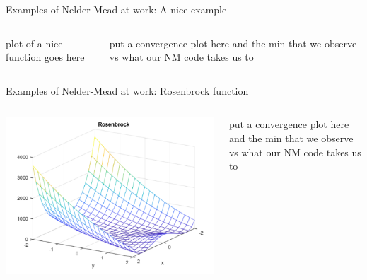 \documentclass{beamer}
\begin{document}
\begin{frame}{Examples of Nelder-Mead at work: A nice example}
\begin{columns}
\begin{column}{0.4\linewidth}
	plot of a nice function goes here	
\end{column}
\begin{column}{0.58\linewidth}
	put a convergence plot here and the min that we observe vs what our NM code takes us to
\end{column}
\end{columns}
\end{frame}

\begin{frame}{Examples of Nelder-Mead at work: Rosenbrock function}
\begin{columns}
\begin{column}{0.4\linewidth}
	\includegraphics[width=0.95\linewidth]{rosenbrockPlot1}
\end{column}
\begin{column}{0.58\linewidth}
	put a convergence plot here and the min that we observe vs what our NM code takes us to
\end{column}
\end{columns}
\end{frame}
\end{document}
